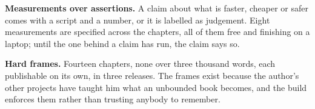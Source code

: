 \begin{note}
\textbf{Measurements over assertions.} A claim about what is faster, cheaper
or safer comes with a script and a number, or it is labelled as judgement.
Eight measurements are specified across the chapters, all of them free and
finishing on a laptop; until the one behind a claim has run, the claim says
so.
\end{note}

\begin{note}
\textbf{Hard frames.} Fourteen chapters, none over three thousand words, each
publishable on its own, in three releases. The frames exist because the
author's other projects have taught him what an unbounded book becomes, and
the build enforces them rather than trusting anybody to remember.
\end{note}
